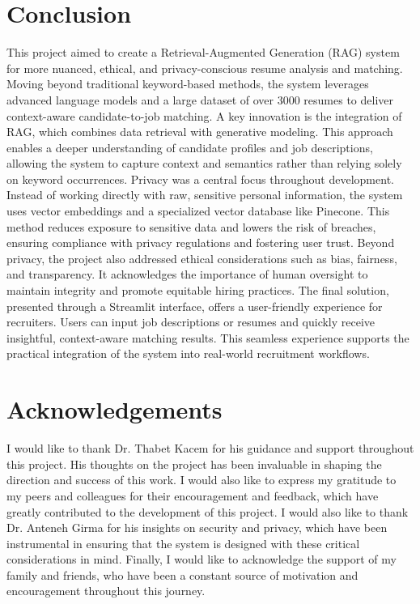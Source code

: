 \documentclass[12pt]{report}
\begin{document}
\section{Conclusion}
This project aimed to create a Retrieval-Augmented Generation (RAG) system for more nuanced, ethical, and privacy-conscious resume analysis and matching. Moving beyond traditional keyword-based methods, the system leverages advanced language models and a large dataset of over 3000 resumes to deliver context-aware candidate-to-job matching. A key innovation is the integration of RAG, which combines data retrieval with generative modeling. This approach enables a deeper understanding of candidate profiles and job descriptions, allowing the system to capture context and semantics rather than relying solely on keyword occurrences. Privacy was a central focus throughout development. Instead of working directly with raw, sensitive personal information, the system uses vector embeddings and a specialized vector database like Pinecone. This method reduces exposure to sensitive data and lowers the risk of breaches, ensuring compliance with privacy regulations and fostering user trust. Beyond privacy, the project also addressed ethical considerations such as bias, fairness, and transparency. It acknowledges the importance of human oversight to maintain integrity and promote equitable hiring practices. The final solution, presented through a Streamlit interface, offers a user-friendly experience for recruiters. Users can input job descriptions or resumes and quickly receive insightful, context-aware matching results. This seamless experience supports the practical integration of the system into real-world recruitment workflows. 

\section{Acknowledgements}
I would like to thank Dr. Thabet Kacem for his guidance and support throughout this project. His thoughts on the project has been invaluable in shaping the direction and success of this work. I would also like to express my gratitude to my peers and colleagues for their encouragement and feedback, which have greatly contributed to the development of this project. I would also like to thank Dr. Anteneh Girma for his insights on security and privacy, which have been instrumental in ensuring that the system is designed with these critical considerations in mind. Finally, I would like to acknowledge the support of my family and friends, who have been a constant source of motivation and encouragement throughout this journey.

\label{LastPage}


\clearpage
{}
{}
\printbibliography
\end{document}

